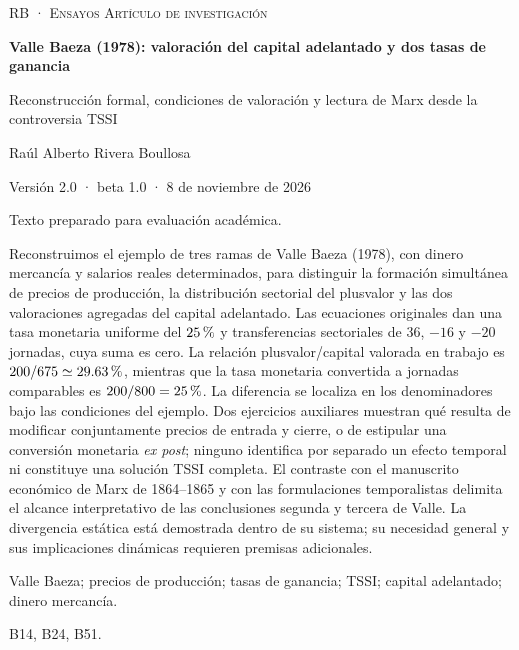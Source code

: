 \documentclass[10pt,twoside]{article}
\newcommand{\pct}{\ifmmode\text{\char37}\else\char37\fi}
\begin{document}
\thispagestyle{empty}
\vspace*{18mm}
{\small\scshape RB · Ensayos \hfill Artículo de investigación}\par
\vspace{18mm}
{\huge\bfseries Valle Baeza (1978): valoración del capital adelantado y dos tasas de ganancia\par}
\vspace{6mm}
{\large Reconstrucción formal, condiciones de valoración y lectura de Marx desde la controversia TSSI\par}
\vspace{16mm}
{\normalsize Raúl Alberto Rivera Boullosa\par}
\vfill
{\small Versión 2.0 · beta 1.0 · 8 de noviembre de 2026\par}
{\small Texto preparado para evaluación académica.\par}
\clearpage
\thispagestyle{plain}
 Reconstruimos el ejemplo de tres ramas de Valle Baeza (1978), con dinero mercancía y salarios reales determinados, para distinguir la formación simultánea de precios de producción, la distribución sectorial del plusvalor y las dos valoraciones agregadas del capital adelantado. Las ecuaciones originales dan una tasa monetaria uniforme del $25\,\pct$ y transferencias sectoriales de $36$, $-16$ y $-20$ jornadas, cuya suma es cero. La relación plusvalor/capital valorada en trabajo es $200/675\simeq29.63\,\pct$, mientras que la tasa monetaria convertida a jornadas comparables es $200/800=25\,\pct$. La diferencia se localiza en los denominadores bajo las condiciones del ejemplo. Dos ejercicios auxiliares muestran qué resulta de modificar conjuntamente precios de entrada y cierre, o de estipular una conversión monetaria \emph{ex post}; ninguno identifica por separado un efecto temporal ni constituye una solución TSSI completa. El contraste con el manuscrito económico de Marx de 1864--1865 y con las formulaciones temporalistas delimita el alcance interpretativo de las conclusiones segunda y tercera de Valle. La divergencia estática está demostrada dentro de su sistema; su necesidad general y sus implicaciones dinámicas requieren premisas adicionales.\par
\vspace{2mm}
 Valle Baeza; precios de producción; tasas de ganancia; TSSI; capital adelantado; dinero mercancía.\par
\vspace{2mm}
 B14, B24, B51.\par
\clearpage
\end{document}
